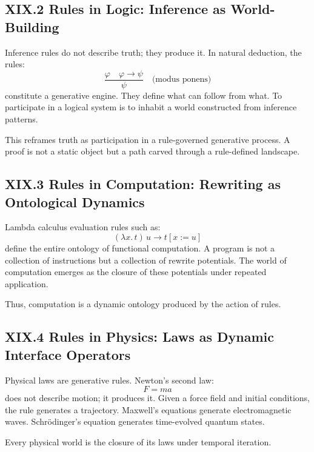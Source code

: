 \documentclass[12pt,letterpaper]{article}
\begin{document}
\subsection{XIX.2 Rules in Logic: Inference as World-Building}

Inference rules do not describe truth; they produce it. In natural deduction, the rules:
\[
\frac{\varphi \quad \varphi \to \psi}{\psi}
\quad\text{(modus ponens)}
\]
constitute a generative engine. They define what can follow from what. To participate in a logical system is to inhabit a world constructed from inference patterns.

This reframes truth as participation in a rule-governed generative process. A proof is not a static object but a path carved through a rule-defined landscape.

\subsection{XIX.3 Rules in Computation: Rewriting as Ontological Dynamics}

Lambda calculus evaluation rules such as:
\[
(\lambda x.\, t)\, u \to t[x := u]
\]
define the entire ontology of functional computation. A program is not a collection of instructions but a collection of rewrite potentials. The world of computation emerges as the closure of these potentials under repeated application.

Thus, computation is a dynamic ontology produced by the action of rules.

\subsection{XIX.4 Rules in Physics: Laws as Dynamic Interface Operators}

Physical laws are generative rules. Newton’s second law:
\[
F = ma
\]
does not describe motion; it produces it. Given a force field and initial conditions, the rule generates a trajectory. Maxwell’s equations generate electromagnetic waves. Schrödinger’s equation generates time-evolved quantum states.

Every physical world is the closure of its laws under temporal iteration.
\end{document}
